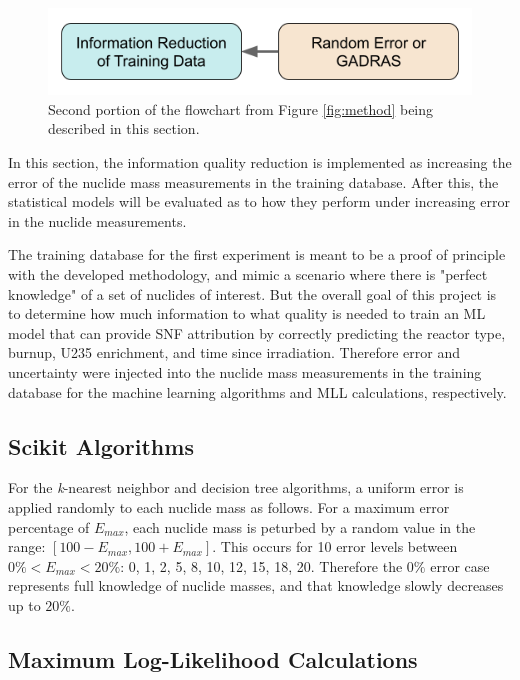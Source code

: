 \begin{figure}[H]
  \centering
  \includegraphics[width=0.7\linewidth]{./chapters/exp1/methodology2.png}
  \caption{Second portion of the flowchart from Figure \ref{fig:method} being 
           described in this section.}
\end{figure}

In this section, the information quality reduction is implemented as increasing
the error of the nuclide mass measurements in the training database. After
this, the statistical models will be evaluated as to how they perform under
increasing error in the nuclide measurements. 

The training database for the first experiment is meant to be a proof of
principle with the developed methodology, and mimic a scenario where there is
"perfect knowledge" of a set of nuclides of interest.  But the overall goal of
this project is to determine how much information to what quality is needed to
train an \gls{ML} model that can provide \gls{SNF} attribution by correctly
predicting the reactor type, burnup, \gls{U235} enrichment, and time since
irradiation.  Therefore error and uncertainty were injected into the nuclide
mass measurements in the training database for the machine learning algorithms
and \gls{MLL} calculations, respectively. 

\subsection{Scikit Algorithms}

For the \textit{k}-nearest neighbor and decision tree algorithms, a uniform
error is applied randomly to each nuclide mass as follows.  For a maximum error
percentage of $E_{max}$, each nuclide mass is peturbed by a random value in the
range: $[100-E_{max},100+E_{max}]$.  This occurs for 10 error levels between
$0\% < E_{max} < 20\%$: 0, 1, 2, 5, 8, 10, 12, 15, 18, 20. Therefore the $0\%$
error case represents full knowledge of nuclide masses, and that knowledge
slowly decreases up to $20\%$. 

\subsection{Maximum Log-Likelihood Calculations}

